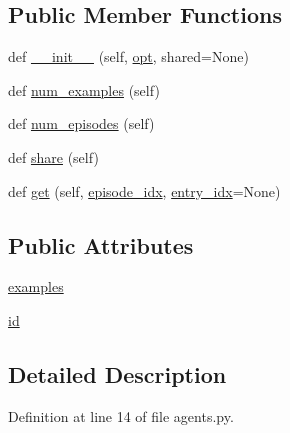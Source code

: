 \subsection*{Public Member Functions}
\begin{DoxyCompactItemize}
\item 
def \hyperlink{classparlai_1_1tasks_1_1qangaroo_1_1agents_1_1DefaultTeacher_aa46ac201bb6d53bc9333a97cbe4d3b41}{\+\_\+\+\_\+init\+\_\+\+\_\+} (self, \hyperlink{classparlai_1_1core_1_1agents_1_1Teacher_a3ce6243860ce978a897922863ed32fa4}{opt}, shared=None)
\item 
def \hyperlink{classparlai_1_1tasks_1_1qangaroo_1_1agents_1_1DefaultTeacher_a88e8755506c654d988f3071823941b91}{num\+\_\+examples} (self)
\item 
def \hyperlink{classparlai_1_1tasks_1_1qangaroo_1_1agents_1_1DefaultTeacher_a467ada61caf807815a88abfd6e742799}{num\+\_\+episodes} (self)
\item 
def \hyperlink{classparlai_1_1tasks_1_1qangaroo_1_1agents_1_1DefaultTeacher_a9563de73ddadc0d567516f5b1615a264}{share} (self)
\item 
def \hyperlink{classparlai_1_1tasks_1_1qangaroo_1_1agents_1_1DefaultTeacher_a02b79b33e67868bc575b65e26de38d51}{get} (self, \hyperlink{classparlai_1_1core_1_1teachers_1_1FixedDialogTeacher_afd4ebab8063eb42d182d30a1a41f133e}{episode\+\_\+idx}, \hyperlink{classparlai_1_1core_1_1teachers_1_1FixedDialogTeacher_ae3201b15f3c3b46a2f3511bad9b43e7d}{entry\+\_\+idx}=None)
\end{DoxyCompactItemize}
\subsection*{Public Attributes}
\begin{DoxyCompactItemize}
\item 
\hyperlink{classparlai_1_1tasks_1_1qangaroo_1_1agents_1_1DefaultTeacher_a3dcc14aaea5fa95b3d878c6c3a2e9e11}{examples}
\item 
\hyperlink{classparlai_1_1tasks_1_1qangaroo_1_1agents_1_1DefaultTeacher_a4d036962beeb5b5d446bf04327e49014}{id}
\end{DoxyCompactItemize}


\subsection{Detailed Description}


Definition at line 14 of file agents.\+py.




